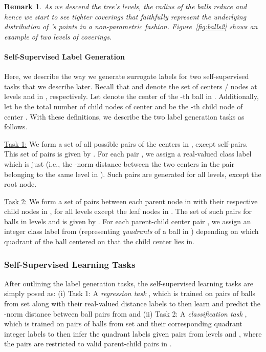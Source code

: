 \documentclass{article}
\newtheorem{remark}{Remark}
\begin{document}
\begin{remark}
As we descend the tree's levels, the radius of the balls reduce and hence we start to see \emph{tighter} coverings that faithfully represent the underlying distribution of 's points in a non-parametric fashion. Figure~\ref{fig:balls2} shows an example of two levels of coverings.
\end{remark}


\paragraph{Self-Supervised Label Generation}
Here, we describe the way we generate surrogate labels for two self-supervised tasks that we describe later.
Recall that  and  denote the set of centers / nodes at levels  and  in , respectively.
Let  denote the center of the -th ball in . 
Additionally, let  be the total number of child nodes of center  and  be the -th child node of center .
With these definitions, we describe the two label generation tasks as follows.

\underline{Task 1:} We form a set of all possible pairs of the centers in , except self-pairs. This set of pairs is given by . 
For each pair , we assign a real-valued class label which is just 
 (i.e., the -norm distance between the two centers in the pair belonging to the same level  in ). Such pairs are generated for all levels, except the root node.

\underline{Task 2:} We form a set of pairs between each parent node in  with their respective child nodes in 
, for all levels except the leaf nodes in . The set of such pairs for balls in levels  and  
is given by 
. 
For each parent-child center pair , we assign an integer class label from  (representing \emph{quadrants} of a ball in ) depending on which quadrant of the ball centered on  that the child center  lies in.


\subsubsection{Self-Supervised Learning Tasks}
\label{ssec:selfsup}
After outlining the label generation tasks, the self-supervised learning tasks are simply posed as:
(i) Task 1: A \emph{regression task} , which is trained on pairs of balls from set  along with their 
real-valued distance labels to then learn and predict the -norm distance between ball pairs from  and 
(ii) Task 2: A \emph{classification task} , which is trained on pairs of balls from set  and their corresponding quadrant integer labels to then infer the quadrant labels given pairs from levels  and , where the pairs are restricted to valid parent-child pairs in . 
\end{document}
